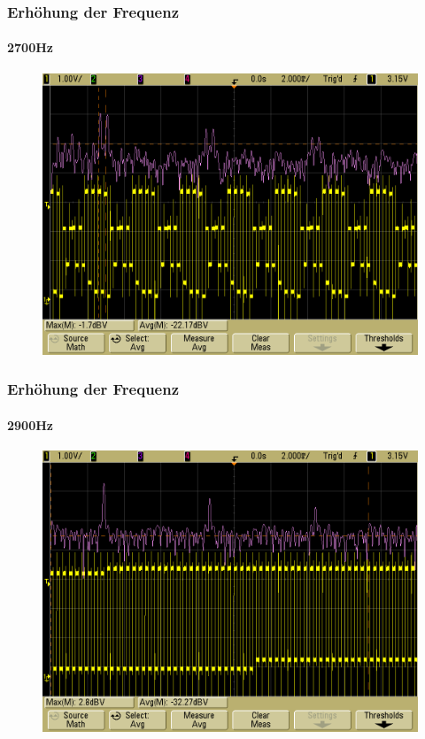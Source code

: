 \begin{frame}
    \frametitle{Erhöhung der Frequenz}
    \framesubtitle{2700Hz}
            \begin{figure}[H]
            \begin{center}
                    \includegraphics[scale=0.2]{./img/oszi/scope_25.png}
            \end{center}
            \end{figure}
\end{frame}
\begin{frame}
    \frametitle{Erhöhung der Frequenz}
    \framesubtitle{2900Hz}
            \begin{figure}[H]
            \begin{center}
                    \includegraphics[scale=0.2]{./img/oszi/scope_26.png}
            \end{center}
            \end{figure}
\end{frame}
